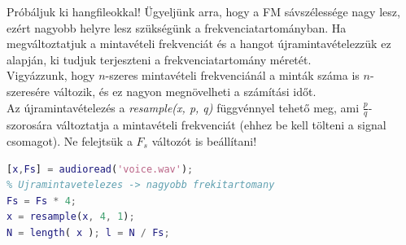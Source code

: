 \documentclass[12pt,a4paper]{article}
\begin{document}
Próbáljuk ki hangfileokkal! Ügyeljünk arra, hogy a FM sávszélessége nagy lesz, ezért nagyobb helyre lesz szükségünk a frekvenciatartományban. Ha megváltoztatjuk a mintavételi frekvenciát és a hangot újramintavételezzük ez alapján, ki tudjuk terjeszteni a frekvenciatartomány méretét. \\
Vigyázzunk, hogy $n$-szeres mintavételi frekvenciánál a minták száma is $n$-szeresére változik, és ez nagyon megnövelheti a számítási időt. \\
Az újramintavételezés a \textit{resample(x, p, q)} függvénnyel tehető meg, ami $\frac{p}{q}$-szorosára változtatja a mintavételi frekvenciát (ehhez be kell tölteni a signal csomagot). Ne felejtsük a $F_s$ változót is beállítani!
\begin{lstlisting}[frame=single,language=matlab,caption=Újramintavételezés]
[x,Fs] = audioread('voice.wav');
% Ujramintavetelezes -> nagyobb frekitartomany
Fs = Fs * 4;
x = resample(x, 4, 1);
N = length( x ); l = N / Fs;
\end{lstlisting}
\end{document}

